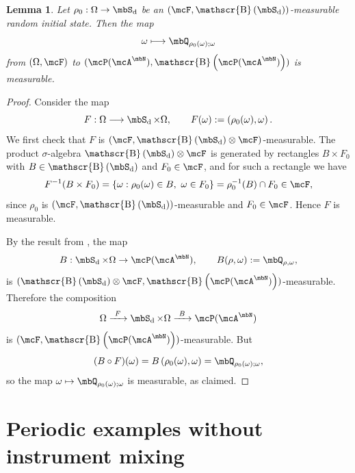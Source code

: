 \documentclass[a4paper]{article}
\numberwithin{equation}{section}   %
\theoremstyle{plain}   %
\theoremstyle{plain}   %
\newtheorem{lemma}{Lemma}[section]   %
\theoremstyle{examplestyle}
\DeclareMathOperator{\states}{\mbS_d}   %
\DeclareMathOperator{\dummyborel}{\mathscr{B}}                  %
\newcommand\borel[1]{\dummyborel\left(#1\right)}    %
\begin{document}
\begin{appendix}
    \begin{lemma}
    \label{lem:Q-random-initial-state}
        Let $\rho_0:\Omega\to\states$ be an $(\mcF,\borel{\states})$-measurable random initial state. 
        Then the map
        \[
            \omega \longmapsto \mbQ_{\rho_0(\omega);\omega}
        \]
        from $(\Omega,\mcF)$ to $(\mcP(\mcA^\mbN),\borel{\mcP(\mcA^\mbN)})$
        is measurable.
    \end{lemma}
        \begin{proof}
            Consider the map
            \[
                F : \Omega \longrightarrow \states\times\Omega,
                \qquad
                F(\omega) := \left(\rho_0(\omega),\omega\right).
            \]
            We first check that $F$ is $(\mcF,\borel{\states}\otimes\mcF)$-measurable.
            The product $\sigma$-algebra $\borel{\states}\otimes\mcF$ is generated by rectangles $B\times F_0$ with $B\in\borel{\states}$ and $F_0\in\mcF$, and for such a rectangle we have
            \[
                F^{-1}(B\times F_0)
                = \{\omega : \rho_0(\omega)\in B,\ \omega\in F_0\}
                = \rho_0^{-1}(B)\cap F_0 \in \mcF,
            \]
            since $\rho_0$ is $(\mcF,\borel{\states})$-measurable and $F_0\in\mcF$.
            Hence $F$ is measurable.
        
            By the result from \cite[Lemma~A.2]{traj}, the map
            \[
                B : \states\times\Omega \to \mcP(\mcA^\mbN),
                \qquad
                B(\rho,\omega) := \mbQ_{\rho,\omega},
            \]
            is $(\borel{\states}\otimes\mcF,\borel{\mcP(\mcA^\mbN)})$-measurable.
            Therefore the composition
            \[
                \Omega \xrightarrow{\ F\ } \states\times\Omega
                   \xrightarrow{\ B\ } \mcP(\mcA^\mbN)
            \]
            is $(\mcF,\borel{\mcP(\mcA^\mbN)})$-measurable.
            But
            \[
                (B\circ F)(\omega)
                = B\left(\rho_0(\omega),\omega\right)
                = \mbQ_{\rho_0(\omega);\omega},
            \]
            so the map $\omega\mapsto\mbQ_{\rho_0(\omega);\omega}$ is measurable, as claimed.
        \end{proof}


\section{Periodic examples without instrument mixing}
\label{app:periodic-examples}


\end{appendix}
\end{document}
